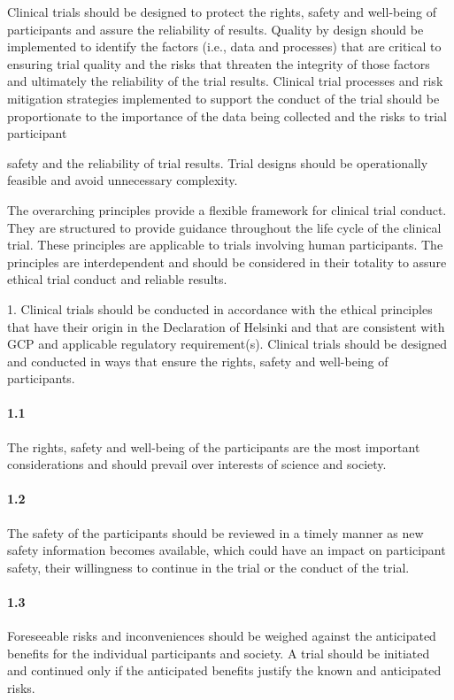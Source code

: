 \documentclass[11pt]{article}
\begin{document}
Clinical trials should be designed to protect the rights, safety and well-being of participants and assure the reliability of results. Quality by design should be implemented to identify the factors (i.e., data and processes) that are critical to ensuring trial quality and the risks that threaten the integrity of those factors and ultimately the reliability of the trial results. Clinical trial processes and risk mitigation strategies implemented to support the conduct of the trial should be proportionate to the importance of the data being collected and the risks to trial participant


safety and the reliability of trial results. Trial designs should be operationally feasible and avoid unnecessary complexity.


The overarching principles provide a flexible framework for clinical trial conduct. They are structured to provide guidance throughout the life cycle of the clinical trial. These principles are applicable to trials involving human participants. The principles are interdependent and should be considered in their totality to assure ethical trial conduct and reliable results.


1. Clinical trials should be conducted in accordance with the ethical principles that have their origin in the Declaration of Helsinki and that are consistent with GCP and applicable regulatory requirement(s). Clinical trials should be designed and conducted in ways that ensure the rights, safety and well-being of participants.


\paragraph{1.1} The rights, safety and well-being of the participants are the most important considerations and should prevail over interests of science and society.

\paragraph{1.2} The safety of the participants should be reviewed in a timely manner as new safety information becomes available, which could have an impact on participant safety, their willingness to continue in the trial or the conduct of the trial.

\paragraph{1.3} Foreseeable risks and inconveniences should be weighed against the anticipated benefits for the individual participants and society. A trial should be initiated and continued only if the anticipated benefits justify the known and anticipated risks.
\end{document}
